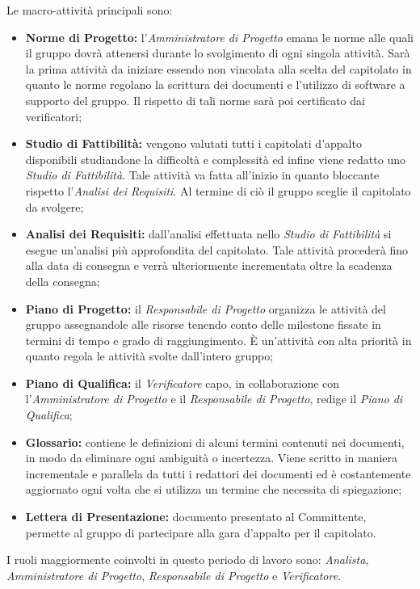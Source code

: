 \noindent Le macro-attività principali sono:
\begin{itemize}
	\item \textbf{Norme di Progetto:} l'\textit{Amministratore di Progetto} emana le norme alle quali il gruppo dovrà attenersi durante lo svolgimento di ogni singola attività. Sarà la prima attività da iniziare essendo non vincolata alla scelta del capitolato in quanto le norme regolano la scrittura dei documenti e l'utilizzo di software a supporto del gruppo. Il rispetto di tali norme sarà poi certificato dai verificatori;
	\item \textbf{Studio di Fattibilità:} vengono valutati tutti i capitolati d'appalto disponibili studiandone la difficoltà e complessità	ed infine viene redatto uno \textit{Studio di Fattibilità}. Tale attività va fatta all'inizio in quanto bloccante rispetto l'\textit{Analisi dei Requisiti}. Al termine di ciò il gruppo sceglie il capitolato da svolgere;
	\item \textbf{Analisi dei Requisiti:} dall'analisi effettuata nello \textit{Studio di Fattibilità} si esegue un'analisi più approfondita del capitolato.	Tale attività procederà fino alla data di consegna e verrà ulteriormente incrementata oltre la scadenza della consegna;
	\item \textbf{Piano di Progetto:} il \textit{Responsabile di Progetto} organizza le attività del gruppo assegnandole alle risorse tenendo conto delle \gls{milestone} fissate in termini di tempo e grado di raggiungimento. È un'attività con alta priorità in quanto regola le attività svolte dall'intero gruppo;
	\item \textbf{Piano di Qualifica:} il \textit{Verificatore} capo, in collaborazione con l'\textit{Amministratore di Progetto} e il \textit{Responsabile di Progetto}, redige il \textit{Piano di Qualifica}; 
	\item \textbf{Glossario:} contiene le definizioni di alcuni termini contenuti nei documenti, in modo da eliminare ogni ambiguità o incertezza. Viene scritto in maniera incrementale e parallela da tutti i redattori dei documenti ed è costantemente aggiornato ogni volta che si utilizza un termine che necessita di spiegazione;
	\item \textbf{Lettera di Presentazione:} documento presentato al Committente, permette al gruppo di partecipare alla gara d'appalto per il capitolato.	
\end{itemize}
I ruoli maggiormente coinvolti in questo periodo di lavoro sono: \textit{Analista}, \textit{Amministratore di Progetto}, \textit{Responsabile di Progetto} e \textit{Verificatore}.
\newpage
